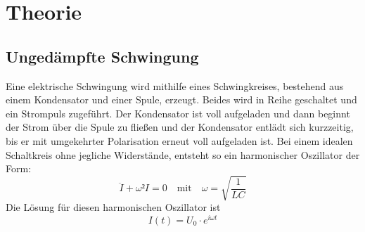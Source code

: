 \section{Theorie}
\label{sec:Theorie}

\subsection{Ungedämpfte Schwingung}
Eine elektrische Schwingung wird mithilfe eines Schwingkreises, bestehend aus einem Kondensator und einer Spule, erzeugt.
Beides wird in Reihe geschaltet und ein Strompuls zugeführt.
Der Kondensator ist voll aufgeladen und dann beginnt der Strom über die Spule zu fließen und der Kondensator entlädt sich kurzzeitig, bis er mit umgekehrter Polarisation erneut voll aufgeladen ist.
Bei einem idealen Schaltkreis ohne jegliche Widerstände, entsteht so ein harmonischer Oszillator der Form:
\begin{equation}
    \ddot{I} + \omega² I = 0 \quad\textrm{mit}\quad \omega = \sqrt{\frac{1}{LC}}
    \label{eq:harmossi}
\end{equation}
Die Lösung für diesen harmonischen Oszillator ist
\begin{equation}
    I(t) = U_0\cdot e^{i\omega t}
\end{equation}
